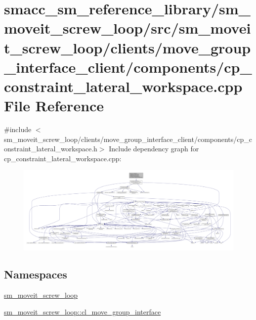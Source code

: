 \hypertarget{sm__moveit__screw__loop_2src_2sm__moveit__screw__loop_2clients_2move__group__interface__client_2978e5b304700e755730fdb2cde0545fa}{}\section{smacc\+\_\+sm\+\_\+reference\+\_\+library/sm\+\_\+moveit\+\_\+screw\+\_\+loop/src/sm\+\_\+moveit\+\_\+screw\+\_\+loop/clients/move\+\_\+group\+\_\+interface\+\_\+client/components/cp\+\_\+constraint\+\_\+lateral\+\_\+workspace.cpp File Reference}
\label{sm__moveit__screw__loop_2src_2sm__moveit__screw__loop_2clients_2move__group__interface__client_2978e5b304700e755730fdb2cde0545fa}
{\ttfamily \#include $<$sm\+\_\+moveit\+\_\+screw\+\_\+loop/clients/move\+\_\+group\+\_\+interface\+\_\+client/components/cp\+\_\+constraint\+\_\+lateral\+\_\+workspace.\+h$>$}\newline
Include dependency graph for cp\+\_\+constraint\+\_\+lateral\+\_\+workspace.\+cpp\+:
\nopagebreak
\begin{figure}[H]
\begin{center}
\leavevmode
\includegraphics[width=350pt]{sm__moveit__screw__loop_2src_2sm__moveit__screw__loop_2clients_2move__group__interface__client_290bded1bc92f24f078448bb84f777aa6}
\end{center}
\end{figure}
\subsection*{Namespaces}
\begin{DoxyCompactItemize}
\item 
 \hyperlink{namespacesm__moveit__screw__loop}{sm\+\_\+moveit\+\_\+screw\+\_\+loop}
\item 
 \hyperlink{namespacesm__moveit__screw__loop_1_1cl__move__group__interface}{sm\+\_\+moveit\+\_\+screw\+\_\+loop\+::cl\+\_\+move\+\_\+group\+\_\+interface}
\end{DoxyCompactItemize}
